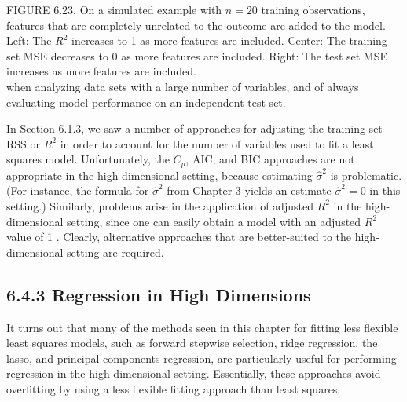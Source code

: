 \documentclass[10pt]{article}
\begin{document}
FIGURE 6.23. On a simulated example with $n=20$ training observations, features that are completely unrelated to the outcome are added to the model. Left: The $R^{2}$ increases to 1 as more features are included. Center: The training set MSE decreases to 0 as more features are included. Right: The test set MSE increases as more features are included.\\
when analyzing data sets with a large number of variables, and of always evaluating model performance on an independent test set.

In Section 6.1.3, we saw a number of approaches for adjusting the training set RSS or $R^{2}$ in order to account for the number of variables used to fit a least squares model. Unfortunately, the $C_{p}$, AIC, and BIC approaches are not appropriate in the high-dimensional setting, because estimating $\hat{\sigma}^{2}$ is problematic. (For instance, the formula for $\hat{\sigma}^{2}$ from Chapter 3 yields an estimate $\hat{\sigma}^{2}=0$ in this setting.) Similarly, problems arise in the application of adjusted $R^{2}$ in the high-dimensional setting, since one can easily obtain a model with an adjusted $R^{2}$ value of 1 . Clearly, alternative approaches that are better-suited to the high-dimensional setting are required.

\subsection*{6.4.3 Regression in High Dimensions}
It turns out that many of the methods seen in this chapter for fitting less flexible least squares models, such as forward stepwise selection, ridge regression, the lasso, and principal components regression, are particularly useful for performing regression in the high-dimensional setting. Essentially, these approaches avoid overfitting by using a less flexible fitting approach than least squares.
\end{document}
